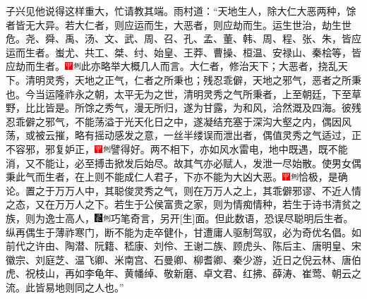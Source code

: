 {子兴见他说得这样重大，忙请教其端。雨村道：``天地生人，除大仁大恶两种，馀者皆无大异。若大仁者，则应运而生，大恶者，则应劫而生。运生世治，劫生世危。尧、舜、禹、汤、文、武、周、召、孔、孟、董、韩、周、程、张、朱，皆应运而生者。蚩尤、共工、桀、纣、始皇、王莽、曹操、桓温、安禄山、秦桧等，皆应劫而生者。{\includegraphics[width=3mm]{../Images/00002}\includegraphics[width=3mm]{../Images/00011}\footnotesize \kaishu 此亦略举大概几人而言。}大仁者，修治天下；大恶者，挠乱天下。清明灵秀，天地之正气，仁者之所秉也；残忍乖僻，天地之邪气，恶者之所秉也。今当运隆祚永之朝，太平无为之世，清明灵秀之气所秉者，上至朝廷，下至草野，比比皆是。所馀之秀气，漫无所归，遂为甘露，为和风，洽然溉及四海。彼残忍乖僻之邪气，不能荡溢于光天化日之中，遂凝结充塞于深沟大壑之内，偶因风荡，或被云摧，略有摇动感发之意，一丝半缕误而泄出者，偶值灵秀之气适过，正不容邪，邪复妒正，{\includegraphics[width=3mm]{../Images/00002}\includegraphics[width=3mm]{../Images/00011}\footnotesize \kaishu 譬得好。}两不相下，亦如风水雷电，地中既遇，既不能消，又不能让，必至搏击掀发后始尽。故其气亦必赋人，发泄一尽始散。使男女偶秉此气而生者，在上则不能成仁人君子，下亦不能为大凶大恶。{\includegraphics[width=3mm]{../Images/00002}\includegraphics[width=3mm]{../Images/00011}\footnotesize \kaishu 恰极，是确论。}置之于万万人中，其聪俊灵秀之气，则在万万人之上，其乖僻邪谬、不近人情之态，又在万万人之下。若生于公侯富贵之家，则为情痴情种，若生于诗书清贫之族，则为逸士高人，{\includegraphics[width=3mm]{../Images/00006}\includegraphics[width=3mm]{../Images/00011}\footnotesize \kaishu 巧笔奇言，另开{[}生{]}面。但此数语，恐误尽聪明后生者。}纵再偶生于薄祚寒门，断不能为走卒健仆，甘遭庸人驱制驾驭，必为奇优名倡。如前代之许由、陶潜、阮籍、嵇康、刘伶、王谢二族、顾虎头、陈后主、唐明皇、宋徽宗、刘庭芝、温飞卿、米南宫、石曼卿、柳耆卿、秦少游，近日之倪云林、唐伯虎、祝枝山，再如李龟年、黄幡绰、敬新磨、卓文君、红拂、薛涛、崔莺、朝云之流。此皆易地则同之人也。''

}
